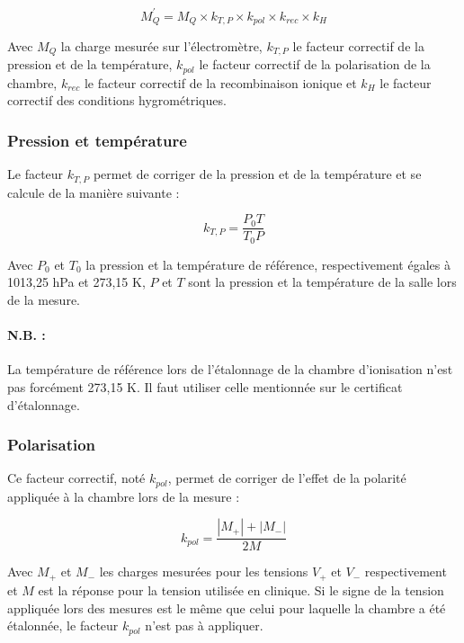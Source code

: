 \documentclass{article}
\begin{document}
\begin{equation}
  M_{Q}^{'} = M_Q \times k_{T,P} \times k_{pol} \times k_{rec} \times k_H
  \label{eq_corr_charge}
\end{equation}

Avec $M_Q$ la charge mesurée sur l'électromètre, $k_{T,P}$ le facteur correctif de la pression et de la température, $k_{pol}$ le facteur correctif de la polarisation de la chambre, $k_{rec}$ le facteur correctif de la recombinaison ionique et $k_H$ le facteur correctif des conditions hygrométriques.

\subsubsection{Pression et température}

Le facteur $k_{T,P}$ permet de corriger de la pression et de la température et se calcule de la manière suivante :

\begin{equation}
  k_{T,P} = \dfrac{P_0T}{T_0P}
  \label{eq_k_TP}
\end{equation}

Avec $P_0$ et $T_0$ la pression et la température de référence, respectivement égales à 1013,25 hPa et 273,15 K, $P$ et $T$ sont la pression et la température de la salle lors de la mesure.

\paragraph*{N.B. :} La température de référence lors de l'étalonnage de la chambre d'ionisation n'est pas forcément 273,15 K. Il faut utiliser celle mentionnée sur le certificat d'étalonnage.

\subsubsection{Polarisation}

Ce facteur correctif, noté $k_{pol}$, permet de corriger de l'effet de la polarité appliquée à la chambre lors de la mesure :

\begin{equation}
  k_{pol} = \dfrac{|M_+| + |M_-|}{2M}
  \label{eq_pol}
\end{equation}

Avec $M_+$ et $M_-$ les charges mesurées pour les tensions $V_+$ et $V_-$ respectivement et $M$ est la réponse pour la tension utilisée en clinique. Si le signe de la tension appliquée lors des mesures est le même que celui pour laquelle la chambre a été étalonnée, le facteur $k_{pol}$ n'est pas à appliquer.
\end{document}
